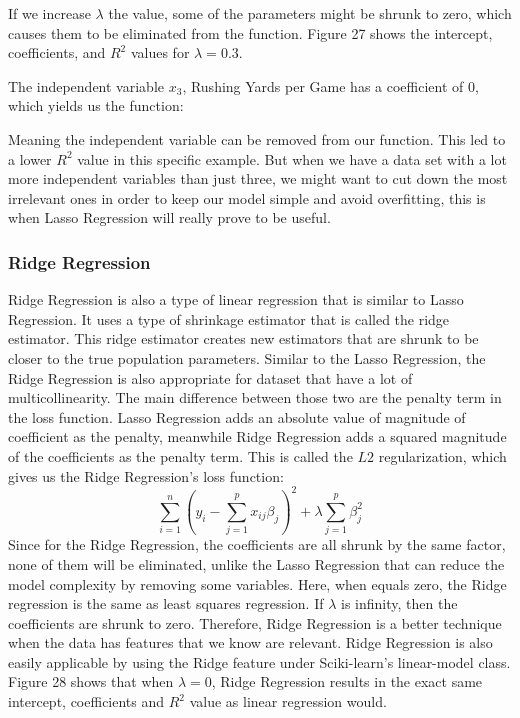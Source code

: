 \documentclass[a4paper,12pt]{report}
\begin{document}
If we increase $\lambda$ the value, some of the parameters might be shrunk to zero, which causes them to be eliminated from the function. Figure 27 shows the intercept, coefficients, and $R^2$ values for $\lambda=0.3$.

The independent variable $x_3$, Rushing Yards per Game has a coefficient of 0, which yields us the function:

Meaning the independent variable  can be removed from our function. This led to a lower $R^2$ value in this specific example. But when we have a data set with a lot more independent variables than just three, we might want to cut down the most irrelevant ones in order to keep our model simple and avoid overfitting, this is when Lasso Regression will really prove to be useful. 

\subsubsection{Ridge Regression}
Ridge Regression is also a type of linear regression that is similar to Lasso Regression. It uses a type of shrinkage estimator that is called the ridge estimator. This ridge estimator creates new estimators that are shrunk to be closer to the true population parameters. Similar to the Lasso Regression, the Ridge Regression is also appropriate for dataset that have a lot of multicollinearity. The main difference between those two are the penalty term in the loss function. Lasso Regression adds an absolute value of magnitude of coefficient as the penalty, meanwhile Ridge Regression adds a squared magnitude of the coefficients as the penalty term. This is called the $L2$ regularization, which gives us the Ridge Regression’s loss function:
$$\sum_{i=1}^n\left(y_i-\sum_{j=1}^px_{ij}\beta_j\right)^2+\lambda\sum_{j=1}^p\beta_j^2$$
Since for the Ridge Regression, the coefficients are all shrunk by the same factor, none of them will be eliminated, unlike the Lasso Regression that can reduce the model complexity by removing some variables. Here, when  equals zero, the Ridge regression is the same as least squares regression. If $\lambda$ is infinity, then the coefficients are shrunk to zero. Therefore, Ridge Regression is a better technique when the data has features that we know are relevant. Ridge Regression is also easily applicable by using the Ridge feature under Sciki-learn’s linear-model class. Figure 28 shows that when $\lambda=0$, Ridge Regression results in the exact same intercept, coefficients and $R^2$ value as linear regression would.
\end{document}
